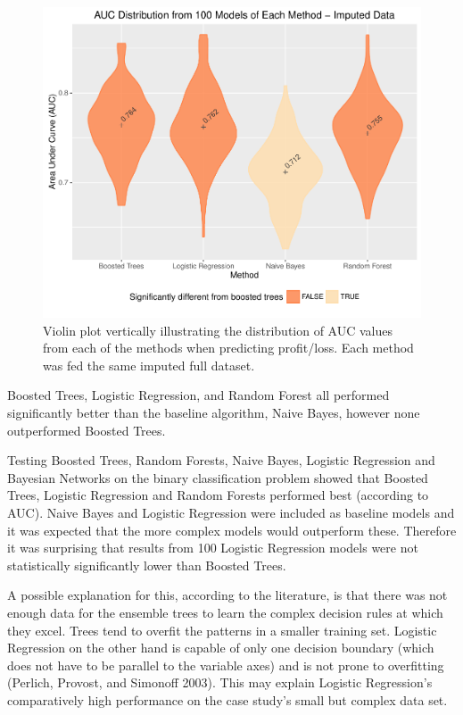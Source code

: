 \documentclass[]{elsarticle} %
\makeatletter
\def\maxwidth{\ifdim\Gin@nat@width>\linewidth\linewidth
\else\Gin@nat@width\fi}
\let\Oldincludegraphics\includegraphics
\renewcommand{\includegraphics}[1]{\Oldincludegraphics[width=\maxwidth]{#1}}
\makeatother
\begin{document}
\begin{figure}[htbp]
\centering
\includegraphics{Consulting_Profitability_Paper_files/figure-latex/mice_violin-1.pdf}
\caption{Violin plot vertically illustrating the distribution of AUC
values from each of the methods when predicting profit/loss. Each method
was fed the same imputed full dataset.}
\end{figure}

Boosted Trees, Logistic Regression, and Random Forest all performed
significantly better than the baseline algorithm, Naive Bayes, however
none outperformed Boosted Trees.

Testing Boosted Trees, Random Forests, Naive Bayes, Logistic Regression
and Bayesian Networks on the binary classification problem showed that
Boosted Trees, Logistic Regression and Random Forests performed best
(according to AUC). Naive Bayes and Logistic Regression were included as
baseline models and it was expected that the more complex models would
outperform these. Therefore it was surprising that results from 100
Logistic Regression models were not statistically significantly lower
than Boosted Trees.

A possible explanation for this, according to the literature, is that
there was not enough data for the ensemble trees to learn the complex
decision rules at which they excel. Trees tend to overfit the patterns
in a smaller training set. Logistic Regression on the other hand is
capable of only one decision boundary (which does not have to be
parallel to the variable axes) and is not prone to overfitting (Perlich,
Provost, and Simonoff 2003). This may explain Logistic Regression's
comparatively high performance on the case study's small but complex
data set.
\end{document}
